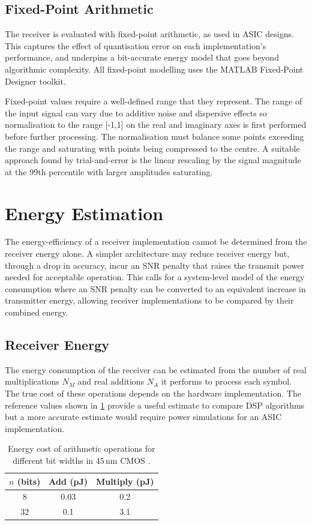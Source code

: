\documentclass[12pt,a4paper]{report}
\begin{document}
\subsection{Fixed-Point Arithmetic}
The receiver is evaluated with fixed-point arithmetic, as used in ASIC designs. This captures the effect of quantisation error on each implementation's performance, and underpins a bit-accurate energy model that goes beyond algorithmic complexity. All fixed-point modelling uses the MATLAB Fixed-Point Designer toolkit.

Fixed-point values require a well-defined range that they represent. The range of the input signal can vary due to additive noise and dispersive effects so normalisation to the range [-1,1] on the real and imaginary axes is first performed before further processing. The normalisation must balance some points exceeding the range and saturating with points being compressed to the centre. A suitable approach found by trial-and-error is the linear rescaling by the signal magnitude at the 99th percentile with larger amplitudes saturating.

\section{Energy Estimation}
The energy-efficiency of a receiver implementation cannot be determined from the receiver energy alone. A simpler architecture may reduce receiver energy but, through a drop in accuracy, incur an SNR penalty that raises the transmit power needed for acceptable operation. This calls for a system-level model of the energy consumption where an SNR penalty can be converted to an equivalent increase in transmitter energy, allowing receiver implementations to be compared by their combined energy.
\subsection{Receiver Energy}\label{sec:rx_energy}
The energy consumption of the receiver can be estimated from the number of real multiplications \(N_M\) and real additions \(N_A\) it performs to process each symbol. The true cost of these operations depends on the hardware implementation. The reference values shown in \cref{tab:energy} provide a useful estimate to compare DSP algorithms but a more accurate estimate would require power simulations for an ASIC implementation.

\begin{table}[H]
    \centering
    \caption{Energy cost of arithmetic operations for different bit widths in 45\,nm CMOS \cite{horowitz2014computing}.}
    \label{tab:energy}
    \begin{tabular}{ccc}
        \toprule
        \(n\) (bits) & Add (pJ) & Multiply (pJ) \\
        \midrule
        8  & 0.03 & 0.2 \\
        32 & 0.1  & 3.1 \\
        \bottomrule
    \end{tabular}
\end{table}
\end{document}
